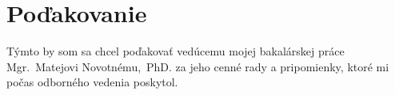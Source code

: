 \chapter*{Poďakovanie}

Týmto by som sa chcel poďakovať vedúcemu mojej bakalárskej práce Mgr.~Matejovi Novotnému,~PhD. za jeho cenné rady a pripomienky, ktoré mi počas odborného vedenia poskytol.
